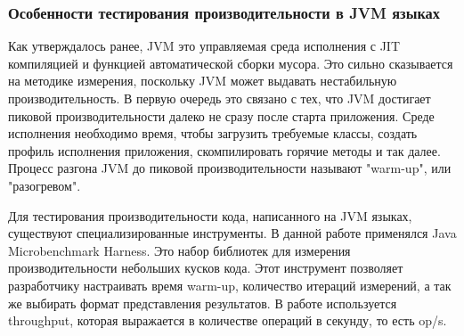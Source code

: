 \subsubsection{Особенности тестирования производительности в JVM языках}
Как утверждалось ранее, JVM это управляемая среда исполнения с JIT компиляцией и функцией автоматической сборки мусора. Это сильно сказывается на методике измерения, поскольку JVM может выдавать нестабильную производительность. 
В первую очередь это связано с тех, что JVM достигает пиковой производительности далеко не сразу после старта приложения.
Среде исполнения необходимо время, чтобы загрузить требуемые классы, создать профиль исполнения приложения, скомпилировать горячие методы и так далее.
Процесс разгона JVM до пиковой производительности называют "warm-up", или "разогревом".
\par
Для тестирования производительности кода, написанного на JVM языках, существуют специализированные инструменты. 
В данной работе применялся Java Microbenchmark Harness\cite{jmh}. Это набор библиотек для измерения производительности небольших кусков кода.
Этот инструмент позволяет разработчику настраивать время warm-up, количество итераций измерений, а так же выбирать формат представления результатов. 
В работе используется throughput, которая выражается в количестве операций в секунду, то есть op/s. 

